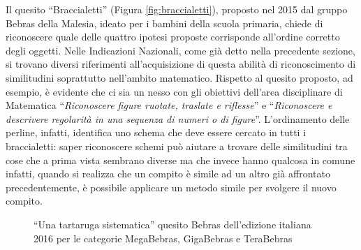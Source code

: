 \documentclass[12pt]{report}
\begin{document}
Il quesito ``Braccialetti'' (Figura \ref{fig:braccialetti}), proposto nel 2015 dal gruppo Bebras della Malesia, ideato per i bambini della scuola primaria, chiede di riconoscere quale delle quattro ipotesi proposte corrisponde all'ordine corretto degli oggetti. Nelle Indicazioni Nazionali, come già detto nella precedente sezione, si trovano diversi riferimenti all'acquisizione di questa abilità di riconoscimento di similitudini soprattutto nell'ambito matematico. Rispetto al quesito proposto, ad esempio, è evidente che ci sia un nesso con gli obiettivi dell'area disciplinare di Matematica ``\textit{Riconoscere figure ruotate, traslate e riflesse}'' e ``\textit{Riconoscere e descrivere regolarità in una sequenza di numeri o di figure}''. L'ordinamento delle perline, infatti, identifica uno schema che deve essere cercato in tutti i braccialetti: saper riconoscere schemi può aiutare a trovare delle similitudini tra cose che a prima vista sembrano diverse ma che invece hanno qualcosa in comune infatti, quando si realizza che un compito è simile ad un altro già affrontato precedentemente, è possibile applicare un metodo simile per svolgere il nuovo
compito.

\bigskip

\begin{figure}[h]
	\centering
	\caption{``Una tartaruga sistematica'' quesito Bebras dell'edizione italiana 2016 per le categorie MegaBebras, GigaBebras e TeraBebras}\label{fig:tartaruga}
\end{figure}
\end{document}
